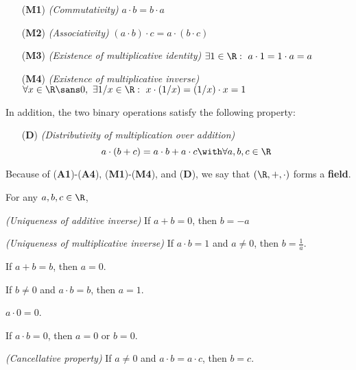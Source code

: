 \begin{itemize}
  \item [(\textbf{M1})] \textit{(Commutativity)} $a\cdot b=b\cdot a$
  \item [(\textbf{M2})] \textit{(Associativity)} $(a\cdot b)\cdot c=a\cdot
        (b\cdot c)$
  \item [(\textbf{M3})] \textit{(Existence of multiplicative identity)} $\exists1\in\R:\ a\cdot 1=1\cdot a=a$
  \item [(\textbf{M4})] \textit{(Existence of multiplicative inverse)} $\forall
        x\in\R\sans0,\ \exists 1/x\in\R:\ x\cdot(1/x)=(1/x)\cdot x=1$
\end{itemize}

In addition, the two binary operations satisfy the following property:
\begin{itemize}
  \item [(\textbf{D})] \textit{(Distributivity of multiplication over addition)}
        $$
          a\cdot(b+c)=a\cdot b+a\cdot c\with\forall a,b,c\in\R
        $$
\end{itemize}

Because of (\textbf{A1})-(\textbf{A4}), (\textbf{M1})-(\textbf{M4}), and
(\textbf{D}), we say that $(\R,+,\cdot)$ forms a \textbf{field}.

\label{a1bdcab}

For any $a,b,c\in\R$,

\begin{enumerati}
  \item \textit{(Uniqueness of additive inverse)} If $a+b=0$, then $b=-a$
  \item \textit{(Uniqueness of multiplicative inverse)} If $a\cdot b=1$ and
  $a\neq0$, then $b=\frac1a$.
  \item If $a+b=b$, then $a=0$.
  \item If $b\neq0$ and $a\cdot b=b$, then $a=1$.
  \item $a\cdot0=0$.
  \item If $a\cdot b=0$, then $a=0$ or $b=0$.
  \item \textit{(Cancellative property)} If $a\neq0$ and $a\cdot b=a\cdot c$, then $b=c$.
\end{enumerati}


